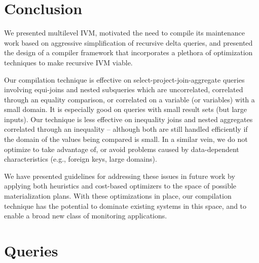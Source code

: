 \documentclass{sig-alternate}
\begin{document}
\section{Conclusion}
\label{sec:conclusion}
We presented multilevel IVM, motivated the need to compile its maintenance work based on aggressive simplification of recursive delta queries, and presented the design of a compiler framework that incorporates a plethora of optimization techniques to make recursive IVM viable.

Our compilation technique is effective on select-project-join-aggregate queries involving equi-joins and nested subqueries which are uncorrelated, correlated through an equality comparison, or correlated on a variable (or variables) with a small domain.  It is especially good on queries with small result sets (but large inputs).
%
Our technique is less effective on inequality joins and nested aggregates correlated through an inequality -- although both are still handled efficiently if the domain of the values being compared is small.  In a similar vein, we do not optimize to take advantage of, or avoid problems caused by data-dependent characteristics (e.g., foreign keys, large domains). 

We have presented guidelines for addressing these issues in future work by applying both heuristics and cost-based optimizers to the space of possible materialization plans.  With these optimizations in place, our compilation technique has the potential to dominate existing systems in this space, and to enable a broad new class of monitoring applications.

\footnotesize{

}

\appendix
\vspace{-1mm}
\section{Queries}
\label{app:queries}
\vspace{-2mm}

\end{document}
